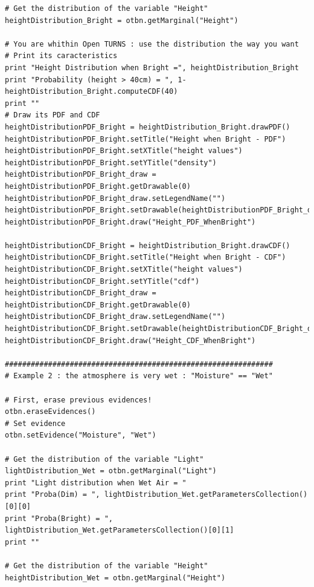 \begin{lstlisting}
# Get the distribution of the variable "Height"
heightDistribution_Bright = otbn.getMarginal("Height")

# You are whithin Open TURNS : use the distribution the way you want
# Print its caracteristics
print "Height Distribution when Bright =", heightDistribution_Bright
print "Probability (height > 40cm) = ", 1-heightDistribution_Bright.computeCDF(40)
print ""
# Draw its PDF and CDF
heightDistributionPDF_Bright = heightDistribution_Bright.drawPDF()
heightDistributionPDF_Bright.setTitle("Height when Bright - PDF")
heightDistributionPDF_Bright.setXTitle("height values")
heightDistributionPDF_Bright.setYTitle("density")
heightDistributionPDF_Bright_draw = heightDistributionPDF_Bright.getDrawable(0)
heightDistributionPDF_Bright_draw.setLegendName("")
heightDistributionPDF_Bright.setDrawable(heightDistributionPDF_Bright_draw,0)
heightDistributionPDF_Bright.draw("Height_PDF_WhenBright")

heightDistributionCDF_Bright = heightDistribution_Bright.drawCDF()
heightDistributionCDF_Bright.setTitle("Height when Bright - CDF")
heightDistributionCDF_Bright.setXTitle("height values")
heightDistributionCDF_Bright.setYTitle("cdf")
heightDistributionCDF_Bright_draw = heightDistributionCDF_Bright.getDrawable(0)
heightDistributionCDF_Bright_draw.setLegendName("")
heightDistributionCDF_Bright.setDrawable(heightDistributionCDF_Bright_draw,0)
heightDistributionCDF_Bright.draw("Height_CDF_WhenBright")

##############################################################
# Example 2 : the atmosphere is very wet : "Moisture" == "Wet"

# First, erase previous evidences!
otbn.eraseEvidences()
# Set evidence
otbn.setEvidence("Moisture", "Wet")

# Get the distribution of the variable "Light"
lightDistribution_Wet = otbn.getMarginal("Light")
print "Light distribution when Wet Air = "
print "Proba(Dim) = ", lightDistribution_Wet.getParametersCollection()[0][0]
print "Proba(Bright) = ", lightDistribution_Wet.getParametersCollection()[0][1]
print ""

# Get the distribution of the variable "Height"
heightDistribution_Wet = otbn.getMarginal("Height")


\end{lstlisting}
